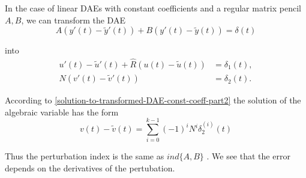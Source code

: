 In the case of linear DAEs with constant coefficients and a regular matrix pencil ${A,B}$, we can transform the DAE
\begin{displaymath}
	A(y'(t)-\tilde{y}'(t)) + B(y'(t)-\tilde{y}(t)) = \delta(t)
\end{displaymath}

into%
\begin{align*}
	u'(t) - \tilde{u}'(t) + \hat{R} (u(t) - \tilde{u}(t) ) &= \delta_1(t), \\
	N(v'(t) - \tilde{v}'(t)) &= \delta_2(t).
\end{align*}

According to \eqref{solution-to-transformed-DAE-const-coeff-part2} the solution of the algebraic variable has the form
\begin{displaymath}
	v(t) - \tilde{v}(t) = \sum_{i=0}^{k-1} (-1)^iN^i \delta_2^{(i)}(t) 
\end{displaymath}

Thus the perturbation index is the same as $ind\{A,B\}$ \cite{NumerikGewöhnlicherDifferentialgleichungen}. We see that the error depends on the derivatives of the pertubation.


	
	
	